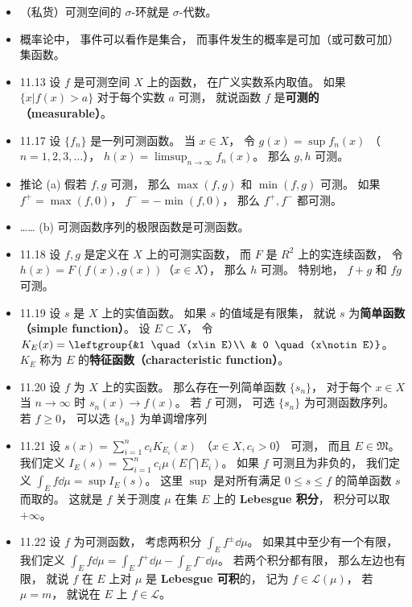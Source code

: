 \begin{itemize}
\item （私货）可测空间的 $\sigma$-环就是 $\sigma$-代数。

\item 概率论中， 事件可以看作是集合， 而事件发生的概率是可加（或可数可加）集函数。

\item 11.13 设 $f$ 是可测空间 $X$ 上的函数， 在广义实数系内取值。 如果 $\{x|f(x)>a\}$ 对于每个实数 $a$ 可测， 就说函数 $f$ 是\textbf{可测的（measurable）}。

\item 11.17 设 $\{f_n\}$ 是一列可测函数。 当 $x\in X$， 令 $g(x)=\sup f_n(x)$ （$n=1,2,3,\dots$）， $h(x)=\limsup_{n\to\infty} f_n(x)$。 那么 $g,h$ 可测。

\item 推论 (a) 假若 $f,g$ 可测， 那么 $\max(f,g)$ 和 $\min(f,g)$ 可测。 如果 $f^+=\max(f,0)$， $f^-=-\min(f,0)$， 那么 $f^+,f^-$ 都可测。

\item …… (b) 可测函数序列的极限函数是可测函数。

\item 11.18 设 $f,g$ 是定义在 $X$ 上的可测实函数， 而 $F$ 是 $R^2$ 上的实连续函数， 令 $h(x)=F(f(x),g(x))$（$x\in X$）， 那么 $h$ 可测。 特别地， $f+g$ 和 $fg$ 可测。

\item 11.19 设 $s$ 是 $X$ 上的实值函数。 如果 $s$ 的值域是有限集， 就说 $s$ 为\textbf{简单函数（simple function）}。 设 $E\subset X$， 令 $K_E(x)=\leftgroup{&1 \quad  (x\in E)\\ & 0 \quad (x\notin E)}$。 $K_E$ 称为 $E$ 的\textbf{特征函数（characteristic function）}。

\item 11.20 设 $f$ 为 $X$ 上的实函数。 那么存在一列简单函数 $\{s_n\}$， 对于每个 $x\in X$ 当 $n\to\infty$ 时 $s_n(x)\to f(x)$。 若 $f$ 可测， 可选 $\{s_n\}$ 为可测函数序列。 若 $f\geqslant 0$， 可以选 $\{s_n\}$ 为单调增序列

\item 11.21 设 $s(x) = \sum_{i=1}^n c_i K_{E_i}(x)$ （$x\in X, c_i>0$） 可测， 而且 $E\in \mathfrak M$。 我们定义 $I_E(s) = \sum_{i=1}^n c_i \mu(E\bigcap E_i)$。 如果 $f$ 可测且为非负的， 我们定义 $\int_E f\dd{\mu} = \sup I_E(s)$。 这里 $\sup$ 是对所有满足 $0\leqslant s\leqslant f$ 的简单函数 $s$ 而取的。 这就是 $f$ 关于测度 $\mu$ 在集 $E$ 上的 \textbf{Lebesgue 积分}， 积分可以取 $+\infty$。

\item 11.22 设 $f$ 为可测函数， 考虑两积分 $\int_E f^\pm \dd{\mu}$。 如果其中至少有一个有限， 我们定义 $\int_E f\dd{\mu} = \int_E f^+\dd{\mu} - \int_E f^-\dd{\mu}$。 若两个积分都有限， 那么左边也有限， 就说 $f$ 在 $E$ 上对 $\mu$ 是 \textbf{Lebesgue 可积}的， 记为 $f\in \mathscr L(\mu)$， 若 $\mu=m$， 就说在 $E$ 上 $f\in \mathscr L$。


\end{itemize}
